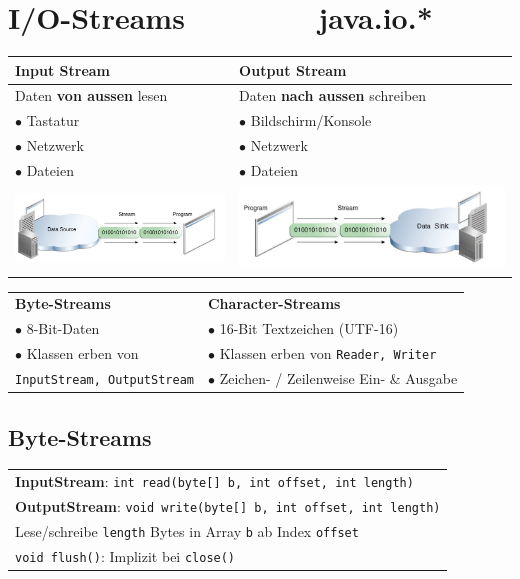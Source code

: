 {\small
\section{I/O-Streams $\qquad\qquad$ java.io.*}
    \begin{tabular}{ll}
        \rowcolor[RGB]{239,239,239} 
        \textbf{Input Stream} & \textbf{Output Stream}\\\hline
        Daten \textbf{von aussen} lesen & Daten \textbf{nach aussen} schreiben\\
        $\bullet$ Tastatur & $\bullet$ Bildschirm/Konsole\\
        $\bullet$ Netzwerk & $\bullet$ Netzwerk\\
        $\bullet$ Dateien & $\bullet$ Dateien\\
        \includegraphics[width=0.46\linewidth]{pictures/streams_1.jpg} & \includegraphics[width=0.46\linewidth]{pictures/streams_2.jpg}\\
    \end{tabular}
    \vspace{-0.2cm}
    \begin{tabular}{ll}
        \rowcolor[RGB]{239,239,239} 
        \textbf{Byte-Streams}            & \textbf{Character-Streams}\\
        $\bullet$ 8-Bit-Daten            & $\bullet$ 16-Bit Textzeichen (UTF-16)\\
        $\bullet$ Klassen erben von      & $\bullet$ Klassen erben von \verb|Reader, Writer|\\
        \verb|InputStream, OutputStream| & $\bullet$ Zeichen- / Zeilenweise Ein- \& Ausgabe\\
    \end{tabular}
    \vspace{-0.1cm}

\subsection{Byte-Streams}
    \begin{tabular}{l}
        \textbf{InputStream}: \verb|int read(byte[] b, int offset, int length)|\\
        \textbf{OutputStream}: \verb|void write(byte[] b, int offset, int length)|\\
        Lese/schreibe \verb|length| Bytes in Array \verb|b| ab Index \verb|offset|\\\hline
        \verb|void flush()|: Implizit bei \verb|close()|\\
    \end{tabular}
    \vspace{-0.3cm}

}
